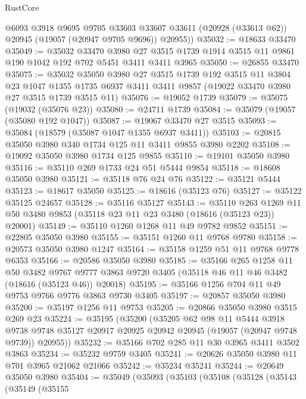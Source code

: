 \begin{lexlean}{RustCore}
\begin{coremodule}
        @6093
        @3918
        @9695
        @9705
        @33603
        @33607
        @33611
        (@20928 (@33613 @62))
        @20945
        (@19057 (@20947 @9705 @9696))
        @20955))
@35032 := @18633 @33470
@35049 := @35032
    @33470
    @3980
    @27
    @3515
    @1739
    @1914
    @3515
    @11
    @9861
    @190
    @1042
    @192
    @702
    @5451
    @3411
    @3411
    @3965
@35050 := @26855 @33470
@35075 := @35032
    @35050
    @3980
    @27
    @3515
    @1739
    @192
    @3515
    @11
    @3804
    @23
    @1047
    @1355
    @1735
    @6937
    @3411
    @3411
    @9857
    (@19022 @33470 @3980 @27 @3515 @1739 @3515 @11)
@35076 := @19052 @1739
@35079 := @35075 (@19032 (@35076 @23))
@35080 := @24711 @1739
@35084 := @35079 (@19057 (@35080 @192 @1047))
@35087 := @19067 @33470 @27 @3515
@35093 := @35084 (@18579 (@35087 @1047 @1355 @6937 @3411))
@35103 := @20815 @35050 @3980 @340 @1734 @125 @11 @3411 @9855 @3980 @2202
@35108 := @19092 @35050 @3980 @1734 @125 @9855
@35110 := @19101 @35050 @3980
@35116 := @35110 @269 @1733 @24 @51 @5444 @9854
@35118 := @18608 @35050 @3980
@35121 := @35118 @76 @24 @76
@35122 := @35121 @5444
@35123 := @18617 @35050
@35125 := @18616 (@35123 @76)
@35127 := @35122 @35125 @24657
@35128 := @35116 @35127
@35143 := @35110
    @263
    @1269
    @11
    @50
    @3480
    @9853
    (@35118 @23 @11 @23 @3480 (@18616 (@35123 @23)) @20001)
@35149 := @35110 @1260 @1268 @11 @49 @9782 @9852
@35151 := @22805 @35050 @3980
@35155 := @35151 @1260 @11 @9768 @9780
@35158 := @20573 @35050 @3980 @1247
@35164 := @35158 @1259 @51 @11 @9768 @9778 @6353
@35166 := @20586 @35050 @3980
@35185 := @35166
    @265
    @1258
    @11
    @50
    @3482
    @9767
    @9777
    @3863
    @9720
    @3405
    (@35118 @46 @11 @46 @3482 (@18616 (@35123 @46)) @20018)
@35195 := @35166 @1256 @704 @11 @49 @9753 @9766 @9776 @3863 @9730 @3405
@35197 := @20857 @35050 @3980
@35200 := @35197 @1256 @11 @9753
@35205 := @20866 @35050 @3980 @3515 @269 @23
@35224 := @35195
    (@35200
      (@35205
        @62
        @98
        @11
        @5444
        @3918
        @9738
        @9748
        @35127
        @20917
        @20925
        @20942
        @20945
        (@19057 (@20947 @9748 @9739))
        @20955))
@35232 := @35166 @702 @285 @11 @30 @3965 @3411 @3502 @3863
@35234 := @35232 @9759 @3405
@35241 := @20626 @35050 @3980 @11 @701 @3965 @21062 @21066
@35242 := @35234 @35241
@35244 := @20649 @35050 @3980
@35404 := @35049
    (@35093
      (@35103
        (@35108
          (@35128
            (@35143
              (@35149
                (@35155

\end{coremodule}
\end{lexlean}
